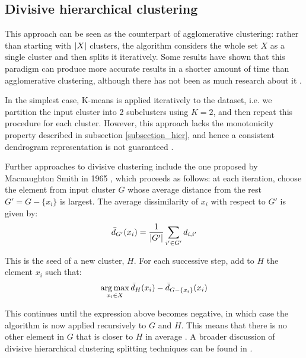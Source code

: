 \documentclass[../main.tex]{subfiles} \label{chapter_soa}
\begin{document}
\subsection{Divisive hierarchical clustering} \label{subsection_divisive}
This approach can be seen as the counterpart of agglomerative clustering: rather than starting with $\lvert X\rvert$ clusters, the algorithm considers the whole set $X$ as a single cluster and then splits it iteratively. Some results have shown that this paradigm can produce more accurate results in a shorter amount of time than agglomerative clustering, although there has not been as much research about it \cite{Manning2009}.  
\par In the simplest case, K-means is applied iteratively to the dataset, i.e. we partition the input cluster into 2 subclusters using $K=2$, and then repeat this procedure for each cluster. However, this approach lacks the monotonicity property described in subsection \ref{subsection_hier}, and hence a consistent dendrogram representation is not guaranteed \cite{hastie2008}.
\par Further approaches to divisive clustering include the one proposed by Macnaughton Smith in 1965 \cite{hastie2008}, which proceeds as follows: at each iteration, choose the element from input cluster $G$ whose average distance from the rest $G' = G - \{x_i\}$ is largest. The average dissimilarity of $x_i$ with respect to $G'$ is given by:
\begin{align*}
\bar{d}_{G'}(x_i) = \frac{1}{\lvert G'\rvert}\sum_{i'\in G'} d_{i,i'}
\end{align*}
\par This is the seed of a new cluster, $H$. For each successive step, add to $H$ the element $x_i$ such that:
\begin{align*}
\operatorname*{arg\,max}_{x_i \in X} \bar{d}_H(x_i) - \bar{d}_{G-\{x_i\}}(x_i)
\end{align*}
\par This continues until the expression above becomes negative, in which case the algorithm is now applied recursively to $G$ and $H$. This means that there is no other element in $G$ that is closer to $H$ in average \cite{hastie2008}. A broader discussion of divisive hierarchical clustering splitting techniques can be found in \cite{.2006}.
\end{document}
